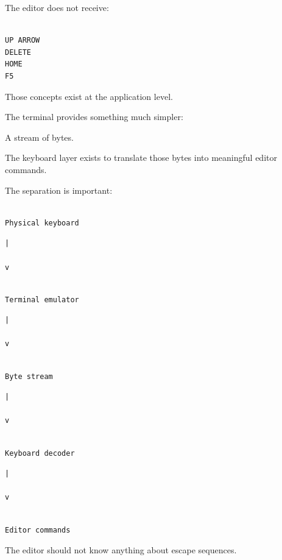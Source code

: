 \documentclass[
  oneside,
  openany]{book}
\begin{document}
The editor does not receive:

\begin{verbatim}

UP ARROW
DELETE
HOME
F5
\end{verbatim}

Those concepts exist at the application level.

The terminal provides something much simpler:

A stream of bytes.

The keyboard layer exists to translate those bytes into meaningful
editor commands.

The separation is important:

\begin{verbatim}

Physical keyboard
\end{verbatim}

\begin{verbatim}
|

v
\end{verbatim}

\begin{verbatim}

Terminal emulator
\end{verbatim}

\begin{verbatim}
|

v
\end{verbatim}

\begin{verbatim}

Byte stream
\end{verbatim}

\begin{verbatim}
|

v
\end{verbatim}

\begin{verbatim}

Keyboard decoder
\end{verbatim}

\begin{verbatim}
|

v
\end{verbatim}

\begin{verbatim}

Editor commands
\end{verbatim}

The editor should not know anything about escape sequences.
\end{document}

